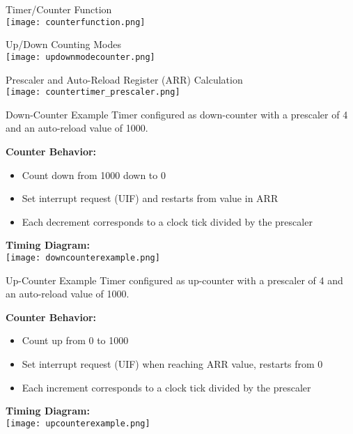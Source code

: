 \multend

\begin{concept}{Timer/Counter Function}\\
\texttt{[image: counterfunction.png]}
\end{concept}

\begin{theorem}{Up/Down Counting Modes}\\
    \texttt{[image: updownmodecounter.png]}
\end{theorem}

\begin{corollary}{Prescaler and Auto-Reload Register (ARR) Calculation}\\
    \texttt{[image: countertimer\_prescaler.png]}
\end{corollary}


\begin{example2}{Down-Counter Example}
    Timer configured as down-counter with a prescaler of 4 and an auto-reload value of 1000.
    
    \textbf{Counter Behavior:}
    \begin{itemize}
        \item Count down from 1000 down to 0
        \item Set interrupt request (UIF) and restarts from value in ARR
        \item Each decrement corresponds to a clock tick divided by the prescaler
    \end{itemize}
    
    \textbf{Timing Diagram:}\\
    \texttt{[image: downcounterexample.png]}
\end{example2}

\begin{example2}{Up-Counter Example}
    Timer configured as up-counter with a prescaler of 4 and an auto-reload value of 1000.
    
    \textbf{Counter Behavior:}
    \begin{itemize}
        \item Count up from 0 to 1000
        \item Set interrupt request (UIF) when reaching ARR value, restarts from 0
        \item Each increment corresponds to a clock tick divided by the prescaler
    \end{itemize}
    
    \textbf{Timing Diagram:}\\
    \texttt{[image: upcounterexample.png]}
\end{example2}

